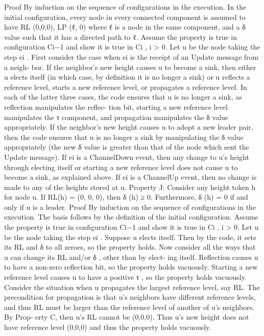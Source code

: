 Proof By induction on the sequence of configurations in the execution. In the initial configuration, every node in every connected component is assumed to have RL (0,0,0), LP (ℓ, 0) where ℓ is a node in the same component, and a δ value such that it has a directed path to ℓ. Assume the property is true in configuration Ci−1 and show it is true in Ci , i > 0. Let u be the node taking the step ei . First consider the case when ei is the receipt of an Update message from a neigh- bor. If the neighbor’s new height causes u to become a sink, then either u elects itself (in which case, by definition it is no longer a sink) or u reflects a reference level, starts a new reference level, or propagates a reference level. In each of the latter three cases, the code ensures that u is no longer a sink, as reflection manipulates the reflec- tion bit, starting a new reference level manipulates the τ component, and propagation manipulates the δ value appropriately. If the neighbor’s new height causes u to adopt a new leader pair, then the code ensures that u is no longer a sink by manipulating the δ value appropriately (the new δ value is greater than that of the node which sent the Update message). If ei is a ChannelDown event, then any change to u’s height through electing itself or starting a new reference level does not cause u to become a sink, as explained above. If ei is a ChannelUp event, then no change is made to any of the heights stored at u. Property J: Consider any height token h for node u. If RL(h) = (0, 0, 0), then δ (h) ≥ 0. Furthermore, δ (h) = 0 if and only if u is a leader. Proof By induction on the sequence of configurations in the execution. The basis follows by the definition of the initial configuration. Assume the property is true in configuration Ci−1 and show it is true in Ci , i > 0. Let u be the node taking the step ei . Suppose u elects itself. Then by the code, it sets its RL and δ to all zeroes, so the property holds. Now consider all the ways that u can change its RL and/or δ , other than by elect- ing itself. Reflection causes u to have a non-zero reflection bit, so the property holds vacuously. Starting a new reference level causes u to have a positive τ , so the property holds vacuously. Consider the situation when u propagates the largest reference level, say RL. The precondition for propagation is that u’s neighbors have different reference levels, and thus RL must be larger than the reference level of another of u’s neighbors. By Prop- erty C, then u’s RL cannot be (0,0,0). Thus u’s new height does not have reference level (0,0,0) and thus the property holds vacuously.
